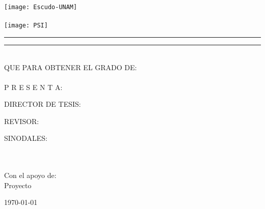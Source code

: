\documentclass[
12pt, %
spanish, %
onehalfspacing, %
headsepline, %
]{MastersDoctoralThesis} %
\author{Jaime Osvaldo Islas Farias}%
\begin{document}
\frontmatter %

\pagestyle{plain} %


\begin{titlepage}

\begin{minipage}[c][8.5in][s]{1in}
\centering
\hspace*{-0.2in} \texttt{[image: Escudo-UNAM]}\\[10pt]
\hskip 2pt\vrule width 2pt height 6.1in
\hskip 1mm\vrule width 1pt height 6.1in\\[10pt]
\hspace*{-0.2in} \texttt{[image: PSI]}
\end{minipage}\hskip 10pt
\begin{minipage}[c][\textheight][s]{5.125in}
\centering
{\Large\scshape\univname}
\vspace{3mm}\hrule height2pt
\vspace{1mm}\hrule height1pt
\vspace{3mm}
{\scshape\facname}\par
\vfill\vfill
{\def\baselinestretch{1}\LARGE\scshape\ttitle\par}
\vfill\vfill
\\[8pt]
QUE PARA OBTENER EL GRADO DE:\\[8pt]
{\scshape\degreename}\\[16pt]
{\huge P  R  E  S  E  N  T  A:}\\[8pt]
{\large {\scshape\authorname}}\par
\vfill
{\small DIRECTOR DE TESIS:\\{\scshape\supname}}\par
\vfill
{\small REVISOR:\\{\scshape\examname}}\par
\vfill
{\small SINODALES:\\{\scshape\SinodalA}\\{\scshape\SinodalB}\\{\scshape\SinodalC}}\par
\vfill
{\small Con el apoyo de:\\Proyecto {\scshape\PAPIIT}}\par
\vfill
{\hspace*{0.2in}\scshape\city\hfill\today}
\end{minipage}
\end{titlepage}
\end{document}
